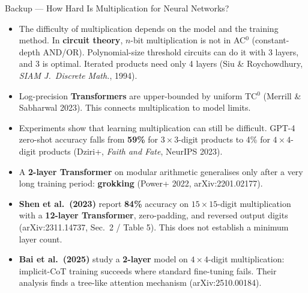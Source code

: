 \documentclass[aspectratio=169,10pt]{beamer}
\newcommand{\tightlist}{\setlength{\itemsep}{0.2em}}
\newcommand{\readout}[1]{\textcolor{readoutblue}{{\mdseries #1}}}
\begin{document}
\begin{frame}{Backup --- How Hard Is Multiplication for Neural Networks?}
\footnotesize
  \begin{itemize}\tightlist
    \item \readout{The difficulty of multiplication depends on the model and the training method.}
          In \textbf{circuit theory}, $n$-bit multiplication is not in AC$^0$
          (constant-depth AND/OR). Polynomial-size threshold circuits can do it with
          \alert{3 layers}, and 3 is optimal. Iterated products need only 4 layers
          (Siu \& Roychowdhury, \emph{SIAM J.\ Discrete Math.}, 1994).
    \item Log-precision \textbf{Transformers} are upper-bounded by uniform TC$^0$
          (Merrill \& Sabharwal 2023). This connects multiplication to model limits.
    \item \readout{Experiments show that learning multiplication can still be difficult.}
          GPT-4 zero-shot accuracy falls from \textbf{59\%} for $3{\times}3$-digit products
          to \alert{4\%} for $4{\times}4$-digit products
          (Dziri+, \emph{Faith and Fate}, NeurIPS 2023).
    \item A \textbf{2-layer Transformer} on modular arithmetic generalises only after a
          very long training period: \textbf{grokking} (Power+ 2022, arXiv:2201.02177).
    \item \textbf{Shen et al.\ (2023)} report \textbf{84\%} accuracy on
          $15{\times}15$-digit multiplication with a \textbf{12-layer Transformer},
          zero-padding, and reversed output digits (arXiv:2311.14737, Sec.\ 2 / Table 5).
          This does not establish a minimum layer count.
    \item \textbf{Bai et al.\ (2025)} study a \textbf{2-layer} model on $4{\times}4$-digit
          multiplication: implicit-CoT training succeeds where standard fine-tuning fails.
          Their analysis finds a tree-like attention mechanism (arXiv:2510.00184).
  \end{itemize}
\end{frame}
\end{document}

